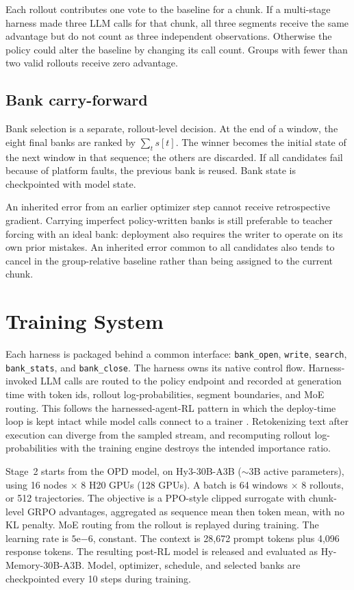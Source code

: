 \documentclass{article}
\begin{document}
Each rollout contributes one vote to the baseline for a chunk. If a multi-stage harness made three LLM calls for that chunk, all three segments receive the same advantage but do not count as three independent observations. Otherwise the policy could alter the baseline by changing its call count. Groups with fewer than two valid rollouts receive zero advantage.

\subsection{Bank carry-forward}

Bank selection is a separate, rollout-level decision. At the end of a window, the eight final banks are ranked by $\sum_t s[t]$. The winner becomes the initial state of the next window in that sequence; the others are discarded. If all candidates fail because of platform faults, the previous bank is reused. Bank state is checkpointed with model state.

An inherited error from an earlier optimizer step cannot receive retrospective gradient. Carrying imperfect policy-written banks is still preferable to teacher forcing with an ideal bank: deployment also requires the writer to operate on its own prior mistakes. An inherited error common to all candidates also tends to cancel in the group-relative baseline rather than being assigned to the current chunk.

\section{Training System}

Each harness is packaged behind a common interface: \texttt{bank\_open}, \texttt{write}, \texttt{search}, \texttt{bank\_stats}, and \texttt{bank\_close}. The harness owns its native control flow. Harness-invoked LLM calls are routed to the policy endpoint and recorded at generation time with token ids, rollout log-probabilities, segment boundaries, and MoE routing. This follows the harnessed-agent-RL pattern in which the deploy-time loop is kept intact while model calls connect to a trainer \citep{lightning}. Retokenizing text after execution can diverge from the sampled stream, and recomputing rollout log-probabilities with the training engine destroys the intended importance ratio.

Stage~2 starts from the OPD model, on Hy3-30B-A3B ($\sim$3B active parameters), using 16 nodes $\times$ 8 H20 GPUs (128 GPUs). A batch is 64 windows $\times$ 8 rollouts, or 512 trajectories. The objective is a PPO-style clipped surrogate with chunk-level GRPO advantages, aggregated as sequence mean then token mean, with no KL penalty. MoE routing from the rollout is replayed during training. The learning rate is $5\mathrm{e}{-6}$, constant. The context is 28{,}672 prompt tokens plus 4{,}096 response tokens. The resulting post-RL model is released and evaluated as Hy-Memory-30B-A3B. Model, optimizer, schedule, and selected banks are checkpointed every 10 steps during training.
\end{document}
